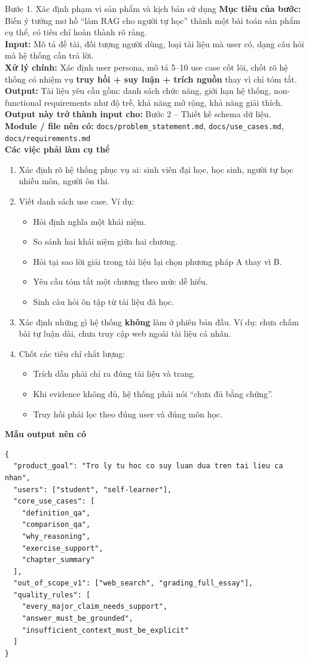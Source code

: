 \documentclass[12pt,a4paper]{article}
\newcommand{\stepgoal}[1]{\textbf{Mục tiêu của bước:} #1\\}
\newcommand{\stepinput}[1]{\textbf{Input:} #1\\}
\newcommand{\stepprocess}[1]{\textbf{Xử lý chính:} #1\\}
\newcommand{\stepoutput}[1]{\textbf{Output:} #1\\}
\newcommand{\stepnext}[1]{\textbf{Output này trở thành input cho:} #1\\}
\newcommand{\stepmodules}[1]{\textbf{Module / file nên có:} #1\\}
\begin{document}
\begin{stepbox}{Bước 1. Xác định phạm vi sản phẩm và kịch bản sử dụng}
\stepgoal{Biến ý tưởng mơ hồ ``làm RAG cho người tự học'' thành một bài toán sản phẩm cụ thể, có tiêu chí hoàn thành rõ ràng.}
\stepinput{Mô tả đề tài, đối tượng người dùng, loại tài liệu mà user có, dạng câu hỏi mà hệ thống cần trả lời.}
\stepprocess{Xác định user persona, mô tả 5--10 use case cốt lõi, chốt rõ hệ thống có nhiệm vụ \textbf{truy hồi + suy luận + trích nguồn} thay vì chỉ tóm tắt.}
\stepoutput{Tài liệu yêu cầu gồm: danh sách chức năng, giới hạn hệ thống, non-functional requirements như độ trễ, khả năng mở rộng, khả năng giải thích.}
\stepnext{Bước 2 -- Thiết kế schema dữ liệu.}
\stepmodules{\texttt{docs/problem\_statement.md}, \texttt{docs/use\_cases.md}, \texttt{docs/requirements.md}}

\textbf{Các việc phải làm cụ thể}
\begin{enumerate}[label=\arabic*.]
    \item Xác định rõ hệ thống phục vụ ai: sinh viên đại học, học sinh, người tự học nhiều môn, người ôn thi.
    \item Viết danh sách use case. Ví dụ:
    \begin{itemize}
        \item Hỏi định nghĩa một khái niệm.
        \item So sánh hai khái niệm giữa hai chương.
        \item Hỏi tại sao lời giải trong tài liệu lại chọn phương pháp A thay vì B.
        \item Yêu cầu tóm tắt một chương theo mức dễ hiểu.
        \item Sinh câu hỏi ôn tập từ tài liệu đã học.
    \end{itemize}
    \item Xác định những gì hệ thống \textbf{không} làm ở phiên bản đầu. Ví dụ: chưa chấm bài tự luận dài, chưa truy cập web ngoài tài liệu cá nhân.
    \item Chốt các tiêu chí chất lượng:
    \begin{itemize}
        \item Trích dẫn phải chỉ ra đúng tài liệu và trang.
        \item Khi evidence không đủ, hệ thống phải nói ``chưa đủ bằng chứng''.
        \item Truy hồi phải lọc theo đúng user và đúng môn học.
    \end{itemize}
\end{enumerate}

\textbf{Mẫu output nên có}
\begin{lstlisting}
{
  "product_goal": "Tro ly tu hoc co suy luan dua tren tai lieu ca nhan",
  "users": ["student", "self-learner"],
  "core_use_cases": [
    "definition_qa",
    "comparison_qa",
    "why_reasoning",
    "exercise_support",
    "chapter_summary"
  ],
  "out_of_scope_v1": ["web_search", "grading_full_essay"],
  "quality_rules": [
    "every_major_claim_needs_support",
    "answer_must_be_grounded",
    "insufficient_context_must_be_explicit"
  ]
}
\end{lstlisting}
\end{stepbox}
\end{document}
